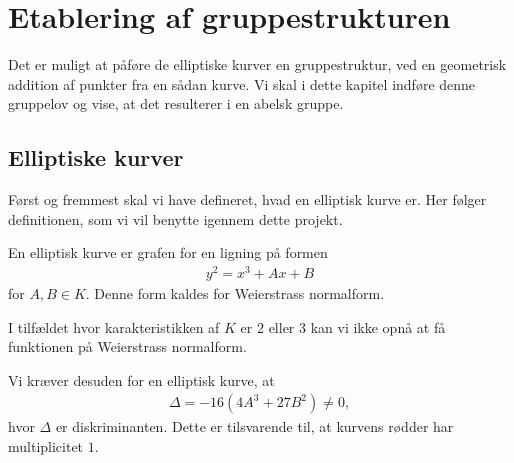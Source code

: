 \section{Etablering af gruppestrukturen}
Det er muligt at påføre de elliptiske kurver en gruppestruktur, ved en
geometrisk addition af punkter fra en sådan kurve. Vi skal i dette kapitel indføre 
denne gruppelov og vise, at det resulterer i en abelsk gruppe.	


\subsection{Elliptiske kurver}
Først og fremmest skal vi have defineret, hvad en elliptisk kurve er. Her 
følger definitionen, som vi vil benytte igennem dette projekt.

\begin{definition}
En elliptisk kurve er grafen for en ligning på formen
\begin{align}
	\label{elliptic}
	y^2 = x^3 + Ax + B
\end{align}
for $A, B \in K$. Denne form kaldes for Weierstrass normalform.
\end{definition}

\begin{remark}
I tilfældet hvor karakteristikken af $K$ er $2$ eller $3$ kan vi
ikke opnå at få funktionen på Weierstrass normalform.
\end{remark}

Vi kræver desuden for en elliptisk kurve, at 
\begin{align*}
	\Delta = -16(4A^3 + 27B^2) \neq 0,
\end{align*}
hvor $\Delta$ er diskriminanten. Dette er tilsvarende til, at kurvens
rødder har multiplicitet $1$.


